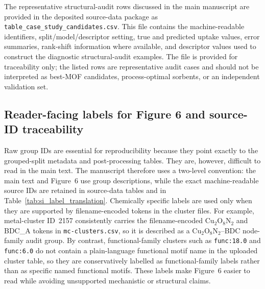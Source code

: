 \documentclass[11pt,a4paper]{article}
\begin{document}
The representative structural-audit rows discussed in the main manuscript are provided in the deposited source-data package as \texttt{table\_case\_study\_candidates.csv}. This file contains the machine-readable identifiers, split/model/descriptor setting, true and predicted uptake values, error summaries, rank-shift information where available, and descriptor values used to construct the diagnostic structural-audit examples. The file is provided for traceability only; the listed rows are representative audit cases and should not be interpreted as best-MOF candidates, process-optimal sorbents, or an independent validation set.



\subsection[Figure 6 labels and source-ID traceability]{Reader-facing labels for Figure 6 and source-ID traceability}

Raw group IDs are essential for reproducibility because they point exactly to the grouped-split metadata
and post-processing tables. They are, however, difficult to read in the main text. The manuscript therefore
uses a two-level convention: the main text and Figure~6 use group descriptions, while the exact
machine-readable source IDs are retained in source-data tables and in Table~\ref{tab:si_label_translation}.
Chemically specific labels are used only when they are supported by filename-encoded tokens in the
cluster files. For example, metal-cluster ID~2157 consistently carries the filename-encoded
Cu$_2$O$_8$N$_2$ and BDC\_A tokens in \texttt{mc-clusters.csv}, so it is described as a
Cu$_2$O$_8$N$_2$--BDC node-family audit group. By contrast, functional-family clusters such as
\texttt{func:18.0} and \texttt{func:6.0} do not contain a plain-language functional motif name in the
uploaded cluster table, so they are conservatively labelled as functional-family labels rather than as
specific named functional motifs. These labels make Figure~6 easier to read while avoiding unsupported
mechanistic or structural claims.
\end{document}
